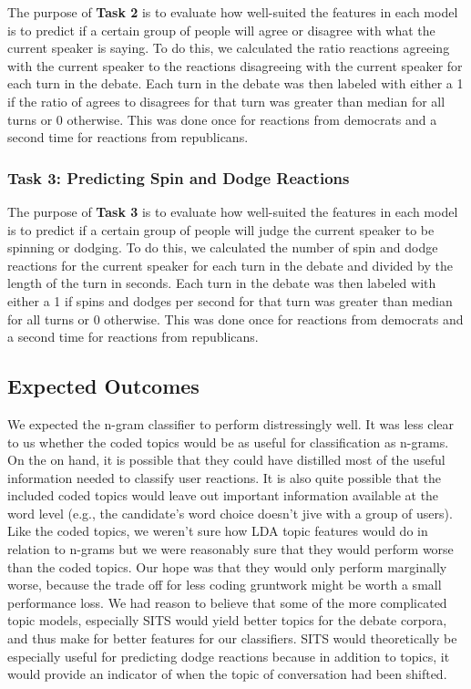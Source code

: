 The purpose of \textbf{Task 2} is to evaluate how well-suited the features in each model is to predict if a certain group of people will agree or disagree with what the current speaker is saying.
To do this, we calculated the ratio reactions agreeing with the current speaker to the reactions disagreeing with the current speaker for each turn in the debate.
Each turn in the debate was then labeled with either a 1 if the ratio of agrees to disagrees for that turn was greater than median for all turns or 0 otherwise.
This was done once for reactions from democrats and a second time for reactions from republicans.

\subsubsection{Task 3: Predicting Spin and Dodge Reactions}

The purpose of \textbf{Task 3} is to evaluate how well-suited the features in each model is to predict if a certain group of people will judge the current speaker to be spinning or dodging.
To do this, we calculated the number of spin and dodge reactions for the current speaker for each turn in the debate and divided by the length of the turn in seconds.
Each turn in the debate was then labeled with either a 1 if spins and dodges per second for that turn was greater than median for all turns or 0 otherwise.
This was done once for reactions from democrats and a second time for reactions from republicans.


\subsection{Expected Outcomes}

We expected the n-gram classifier to perform distressingly well.
It was less clear to us whether the coded topics would be as useful for classification as n-grams.
On the on hand, it is possible that they could have distilled most of the useful information needed to classify user reactions.
It is also quite possible that the included coded topics would leave out important information available at the word level (e.g., the candidate's word choice doesn't jive with a group of users).
Like the coded topics, we weren't sure how LDA topic features would do in relation to n-grams but we were reasonably sure that they would perform worse than the coded topics.
Our hope was that they would only perform marginally worse, because the trade off for less coding gruntwork might be worth a small performance loss.
We had reason to believe that some of the more complicated topic models, especially SITS would yield better topics for the debate corpora, and thus make for better features for our classifiers.
SITS would theoretically be especially useful for predicting dodge reactions because in addition to topics, it would provide an indicator of when the topic of conversation had been shifted.
